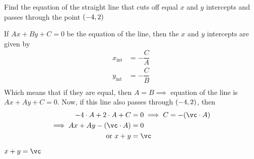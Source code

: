 



\ADD\va\vb\vc

\question[4] Find the equation of the straight line that cuts off equal $x$ and $y$ intercepts 
and passes through the point $(-4, 2)$

\watchout

\ifprintanswers
\fi 

\begin{solution}[\halfpage]
   If $Ax + By + C = 0$ be the equation of the line, then the $x$ and $y$ intercepts are given by
   \begin{align}
   	  x_{\text{int}} &= -\dfrac{C}{A} \\ 
   	  y_{\text{int}} &= -\dfrac{C}{B} \\
   \end{align}
   Which means that if they are equal, then $A = B \implies$ equation of the line is $Ax + Ay + C = 0$. 
   Now, if this line also passes through $(-4, 2)$, then 
   \begin{align}
      \va\cdot A + \vb\cdot A + C &= 0 \implies C = -(\vc\cdot A) \\
      \implies Ax + Ay - (\vc\cdot A) &= 0 \\
      \text{ or } x + y &= \vc
   \end{align}
\end{solution}

\ifprintanswers
  \begin{codex}
    $x+y=\vc$
  \end{codex}
\fi

